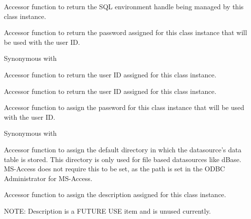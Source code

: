 Accessor function to return the SQL environment handle being managed 
by this class instance.


\label{wxdbconnectinfgetpassword}


Accessor function to return the password assigned for this class 
instance that will be used with the user ID.

Synonymous with 


\label{wxdbconnectinfgetuid}


Accessor function to return the user ID assigned for this class 
instance.


\label{wxdbconnectinfgetuserid}


Accessor function to return the user ID assigned for this class 
instance.


\label{wxdbconnectinfsetauthstr}


Accessor function to assign the password for this class 
instance that will be used with the user ID.

Synonymous with 


\label{wxdbconnectinfsetdefaultdir}


Accessor function to assign the default directory in which the datasource's data 
table is stored.  This directory is only used for file based datasources like 
dBase.  MS-Access does not require this to be set, as the path is set in the 
ODBC Administrator for MS-Access.


\label{wxdbconnectinfsetdescription}


Accessor function to assign the description assigned for this class 
instance.

NOTE: Description is a FUTURE USE item and is unused currently.


